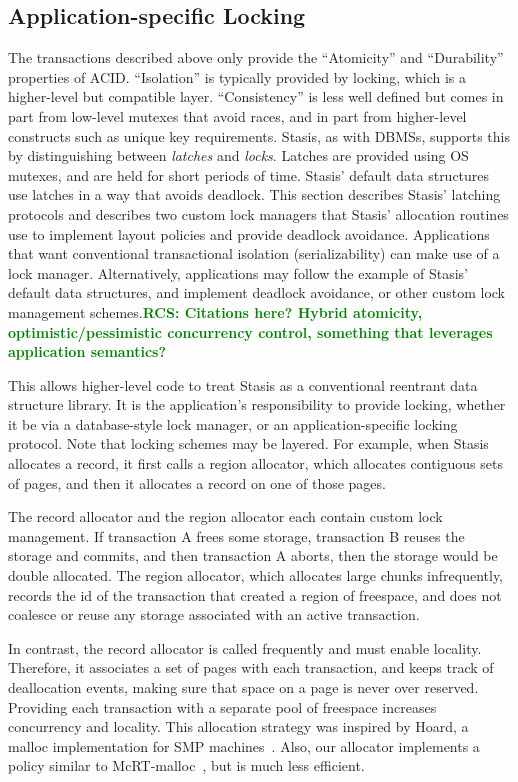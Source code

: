 \documentclass[letterpaper,twocolumn,10pt]{article}
\newcommand{\yad}{Stasis\xspace}
\newcommand{\yads}{Stasis'\xspace}
\newcommand{\rcs}[1]{\textcolor{green}{\bf RCS: #1}}
\begin{document}
\subsection{Application-specific Locking}
\label{sec:locking}
The transactions described above only provide the
``Atomicity'' and ``Durability'' properties of ACID.
  ``Isolation'' is
typically provided by locking, which is a higher-level but
compatible layer.  ``Consistency'' is less well defined but comes in
part from low-level mutexes that avoid races, and in part from
higher-level constructs such as unique key requirements.  \yad, as with DBMSs,
supports this by distinguishing between {\em latches} and {\em locks}.
Latches are provided using OS mutexes, and are held for
short periods of time.  \yads default data structures use latches in a
way that avoids deadlock.  This section describes \yads latching
protocols and describes two custom lock
managers that \yads allocation routines use to implement layout 
policies and provide deadlock avoidance.  Applications that want
conventional transactional isolation (serializability) can make 
use of a lock manager.  Alternatively, applications may follow 
the example of \yads default data structures, and implement 
deadlock avoidance, or other custom lock management schemes.\rcs{Citations here? Hybrid atomicity, optimistic/pessimistic concurrency control, something that leverages application semantics?}

This allows higher-level code to treat \yad as a conventional
reentrant data structure library.  It is the application's
responsibility to provide locking, whether it be via a database-style
lock manager, or an application-specific locking protocol.  Note that
locking schemes may be layered.  For example, when \yad allocates a
record, it first calls a region allocator, which allocates contiguous
sets of pages, and then it allocates a record on one of those pages.

The record allocator and the region allocator each contain custom lock
management.  If transaction A frees some storage, transaction B reuses
the storage and commits, and then transaction A aborts, then the
storage would be double allocated.  The region allocator, which allocates large chunks infrequently, records the id
of the transaction that created a region of freespace, and does not
coalesce or reuse any storage associated with an active transaction.

In contrast, the record allocator is called frequently and must enable locality.  Therefore, it associates a set of pages with
each transaction, and keeps track of deallocation events, making sure
that space on a page is never over reserved.  Providing each
transaction with a separate pool of freespace increases 
concurrency and locality.  This allocation strategy was inspired by
Hoard, a malloc implementation for SMP machines~\cite{hoard}.  Also, 
our allocator implements a policy similar to 
McRT-malloc~\cite{mcrt-malloc}, but is much less efficient.
\end{document}
